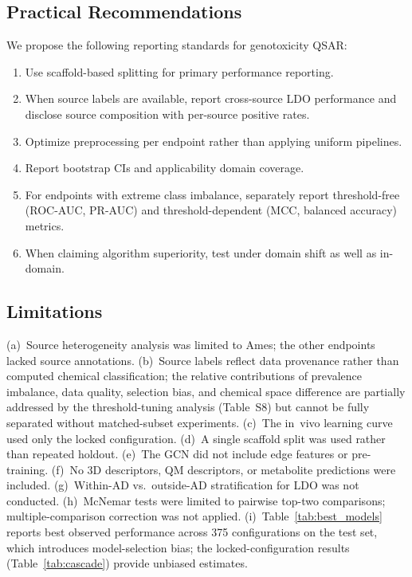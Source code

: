 \subsection{Practical Recommendations}

We propose the following reporting standards for genotoxicity QSAR:

\begin{enumerate}
    \item Use scaffold-based splitting for primary performance reporting.
    \item When source labels are available, report cross-source LDO performance and disclose source composition with per-source positive rates.
    \item Optimize preprocessing per endpoint rather than applying uniform pipelines.
    \item Report bootstrap CIs and applicability domain coverage.
    \item For endpoints with extreme class imbalance, separately report threshold-free (ROC-AUC, PR-AUC) and threshold-dependent (MCC, balanced accuracy) metrics.
    \item When claiming algorithm superiority, test under domain shift as well as in-domain.
\end{enumerate}

\subsection{Limitations}

(a)~Source heterogeneity analysis was limited to Ames; the other endpoints lacked source annotations. (b)~Source labels reflect data provenance rather than computed chemical classification; the relative contributions of prevalence imbalance, data quality, selection bias, and chemical space difference are partially addressed by the threshold-tuning analysis (Table~S8) but cannot be fully separated without matched-subset experiments. (c)~The in~vivo learning curve used only the locked configuration. (d)~A single scaffold split was used rather than repeated holdout. (e)~The GCN did not include edge features or pre-training.\cite{Hu_2020_pretrain} (f)~No 3D descriptors, QM descriptors, or metabolite predictions were included. (g)~Within-AD vs.\ outside-AD stratification for LDO was not conducted. (h)~McNemar tests were limited to pairwise top-two comparisons; multiple-comparison correction\cite{Demsar_2006} was not applied. (i)~Table~\ref{tab:best_models} reports best observed performance across 375 configurations on the test set, which introduces model-selection bias; the locked-configuration results (Table~\ref{tab:cascade}) provide unbiased estimates.
